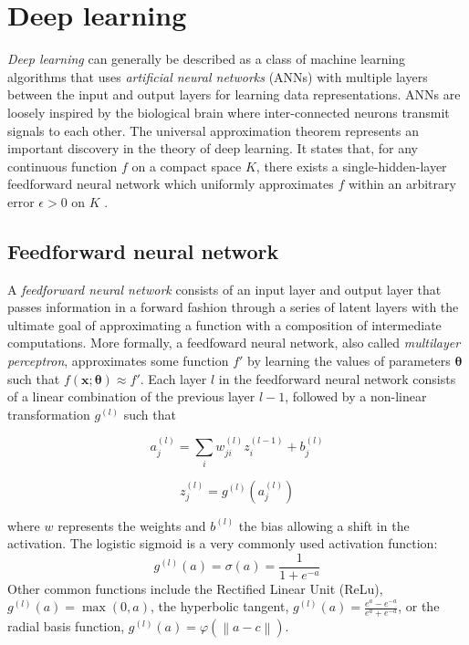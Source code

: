 \documentclass[bsc,frontabs,twoside,singlespacing,parskip,deptreport]{infthesis}     %
\let\Oldsection\section
\renewcommand{\section}{\FloatBarrier\Oldsection}
\let\Oldsubsection\subsection
\renewcommand{\subsection}{\FloatBarrier\Oldsubsection}
\begin{document}
\section{Deep learning}
\textit{Deep learning} can generally be described as a class of machine learning algorithms that uses \textit{artificial neural networks} (ANNs) with multiple layers between the input and output layers for learning data representations. ANNs are loosely inspired by the biological brain where inter-connected neurons transmit signals to each other.
The universal approximation theorem represents an important discovery in the theory of deep learning. It states that, for any continuous function \(f\) on a compact space \(K\), there exists a single-hidden-layer feedforward neural network which uniformly approximates \(f\) within an arbitrary error \(\epsilon>0\) on \(K\) \cite{hornik_multilayer_1989}.

\subsection{Feedforward neural network}
A \textit{feedforward neural network} consists of an input layer and output layer that passes information in a forward fashion through a series of latent layers with the ultimate goal of approximating a function with a composition of intermediate computations. More formally, a feedfoward neural network, also called \textit{multilayer perceptron}, approximates some function \(f'\) by learning the values of parameters \(\mathbf{\theta}\) such that \(f(\mathbf{x} ; \mathbf{\theta}) \approx f'\).
Each layer \(l\) in the feedforward neural network consists of a linear combination of the previous layer \(l-1\), followed by a non-linear transformation \(g^{(l)}\) such that 

\[a_{j}^{(l)}=\sum_{i} w_{j i}^{(l)} z_{i}^{(l-1)}+b_{j}^{(l)}\]

\[z_{j}^{(l)}=g^{(l)}\left(a_{j}^{(l)}\right)\]

where \(w\) represents the weights and \(b^{(l)}\) the bias allowing a shift in the activation. The logistic sigmoid is a very commonly used activation function: \[g^{(l)}(a) = \sigma(a) = \frac{1}{1+e^{-a}}\]
Other common functions include the Rectified Linear Unit (ReLu), \(g^{(l)}(a)= \max(0, a)\), the hyperbolic tangent, \(g^{(l)}(a)={\frac {e^{a}-e^{-a}}{e^{a}+e^{-a}}}\), or the radial basis function, \(g^{(l)}(a)=\varphi (\left\|a -c \right\|)\).
\end{document}
